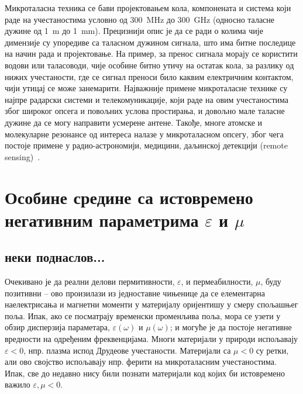 \documentclass[12pt,oneside]{book}
\begin{document}
Микроталасна техника се бави пројектовањем кола, компонената и система који раде на учестаностима условно од \SI{300}{\mega\hertz} до \SI{300}{\giga\hertz} (односно таласне дужине од \SI{1}{\meter} до \SI{1}{\milli\meter}). Прецизнији опис је да се ради о колима чије димензије су упоредиве са таласном дужином сигнала, што има битне последице на начин рада и пројектовање. На пример, за пренос сигнала морају се користити водови или таласоводи, чије особине битно утичу на остатак кола, за разлику од нижих учестаности, где се сигнал преноси било каквим електричним контактом, чији утицај се може занемарити. Најважније примене микроталасне технике су најпре радарски системи и телекомуникације, који раде на овим учестаностима због широког опсега и повољних услова простирања, и довољно мале таласне дужине да се могу направити усмерене антене. Такође, многе атомске и молекуларне резонансе од интереса налазе у микроталасном опсегу, због чега постоје примене у радио-астрономији, медицини, даљинској детекцији (remote sensing)~\cite{djordjevic2005mikrotalasna,pozar2009microwave}.
\cite{markes_knjiga}

\section{Особине средине са истовремено негативним параметрима $\varepsilon$ и $\mu$}
\subsection{неки поднаслов...}

Очекивано је да реални делови пермитивности, $\varepsilon$, и пермеабилности, $\mu$, буду позитивни – ово произилази из једноставне чињенице да се елементарна наелектрисања и магнетни моменти у материјалу оријентишу у смеру спољашњег поља. Ипак, ако се посматрају временски променљива поља, мора се узети у обзир дисперзија параметара, $\varepsilon(\omega)$ и $\mu(\omega)$; и могуће је да постоје негативне вредности на одређеним фреквенцијама. Многи материјали у природи испољавају $\varepsilon < 0$, нпр. плазма испод Друдеове учестаности. Материјали са $\mu<0$ су ретки, али ово својство испољавају нпр. ферити на микроталасним учестаностима. Ипак, све до недавно нису били познати материјали код којих би истовремено важило $\varepsilon,\mu < 0$.
\end{document}
